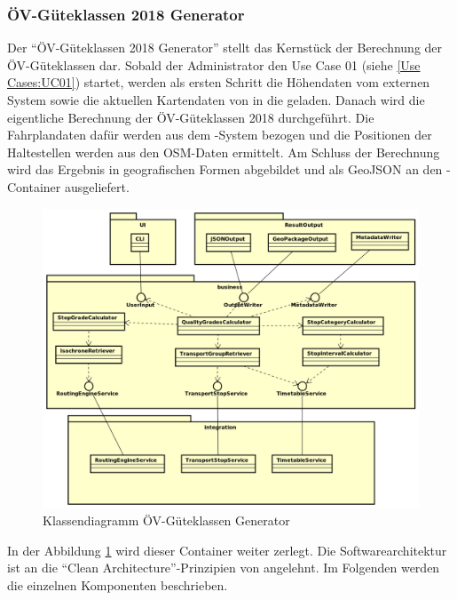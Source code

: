 \subsubsection{ÖV-Güteklassen 2018 Generator}
\label{container:generator}

Der "`\acs{ÖV}-Güteklassen 2018 Generator"' stellt das Kernstück der Berechnung der \acs{ÖV}-Güteklassen dar.
Sobald der Administrator den Use Case 01 (siehe \ref{Use Cases:UC01}) startet, werden als ersten Schritt die Höhendaten vom externen System  sowie die aktuellen Kartendaten von  in die  geladen.
Danach wird die eigentliche Berechnung der \acs{ÖV}-Güteklassen 2018 durchgeführt.
Die Fahrplandaten dafür werden aus dem -System bezogen und die Positionen der Haltestellen werden aus den \ac{OSM}-Daten ermittelt.
Am Schluss der Berechnung wird das Ergebnis in geografischen Formen abgebildet und als \gls{GeoJSON} an den -Container ausgeliefert.

\begin{figure}[ht]
    \centering
    \includegraphics[width=0.9\linewidth]{projectdoc/img/guetklassen_generator_architektur.png}
    \caption[Klassendiagramm ÖV-Güteklassen Generator]{Klassendiagramm ÖV-Güteklassen Generator}
    \label{fig:class_diagram_generator}
\end{figure}

In der Abbildung \ref{fig:class_diagram_generator} wird dieser Container weiter zerlegt.
Die Softwarearchitektur ist an die "`Clean Architecture"'-Prinzipien von \cite{martin_clean_architecture} angelehnt.
Im Folgenden werden die einzelnen Komponenten beschrieben.

